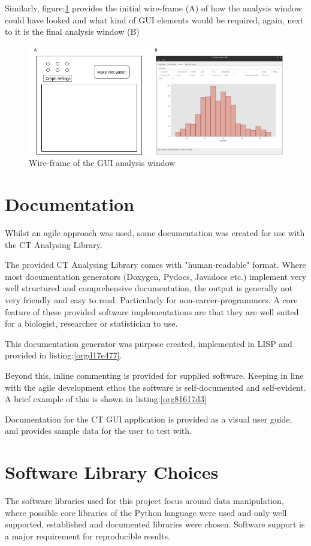 \documentclass[11pt]{report}
\begin{document}
Similarly, figure:\ref{fig:org288770a} provides the initial wire-frame (A) of how the analysis window could have looked and what kind of GUI elements would be required, again, next to it is the final analysis window (B)
\begin{figure}[htbp]
\centering
\includegraphics[width=16cm]{./images/wireframe2.png}
\caption{\label{fig:org288770a}
Wire-frame of the GUI analysis window}
\end{figure}
\section{Documentation}
\label{sec:orge6d6190}
Whilst an agile approach was used, some documentation was created for use with the CT Analysing Library.

The provided CT Analysing Library comes with "human-readable" format. Where most documentation generators (Doxygen, Pydocs, Javadocs etc.) implement very well structured and comprehensive documentation, the output is generally not very friendly and easy to read. Particularly for non-career-programmers. A core feature of these provided software implementations are that they are well suited for a biologist, researcher or statistician to use.

This documentation generator was purpose created, implemented in LISP and provided in listing:\ref{orgd17e477}.

Beyond this, inline commenting is provided for supplied software. Keeping in line with the agile development ethos the software is self-documented and self-evident. A brief example of this is shown in listing:\ref{org81617d3}

Documentation for the CT GUI application is provided as a visual user guide, and provides sample data for the user to test with.
\section{Software Library Choices}
\label{sec:orge654192}
The software libraries used for this project focus around data manipulation, where possible core libraries of the Python language were used and only well supported, established and documented libraries were chosen. Software support is a major requirement for reproducible results.
\end{document}
